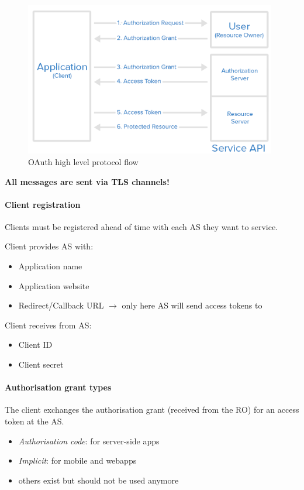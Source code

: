 \begin{figure}[h]
    \centering
    \includegraphics[width=11cm]{images/ch9-oauth-abstract-flow.png}
    \caption{OAuth high level protocol flow}
    \label{fig:oauth-high-level}
\end{figure}

\textbf{All messages are sent via TLS channels!}

\paragraph{Client registration} Clients must be registered ahead of time with each AS they want to service.

Client provides AS with:
\begin{itemize}
    \item Application name
    \item Application website
    \item Redirect/Callback URL $\longrightarrow$ only here AS will send access tokens to
\end{itemize}

Client receives from AS:
\begin{itemize}
    \item Client ID
    \item Client secret
\end{itemize}

\paragraph{Authorisation grant types} The client exchanges the authorisation grant (received from the RO) for an access token at the AS.
\begin{itemize}
    \item \emph{Authorisation code}: for server-side apps
    \item \emph{Implicit}: for mobile and webapps
    \item others exist but should not be used anymore
\end{itemize}

